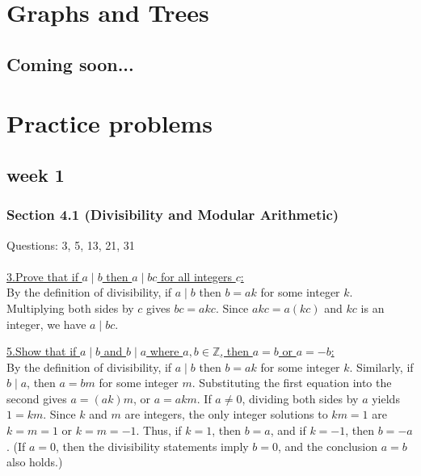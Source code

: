 \documentclass[12pt]{article}
\begin{document}
\section{Graphs and Trees}
\subsection*{Coming soon...}

\newpage
\section{Practice problems}
\subsection*{week 1}


\subsubsection*{Section 4.1 (Divisibility and Modular Arithmetic)}

Questions: 3, 5, 13, 21, 31
\\\\
\underline{3.\;Prove that if $a \mid b$ then $a \mid bc$ for all integers $c$:}
\\\indent By the definition of divisibility, if $a \mid b$ then $b = ak$ for some integer $k$.
Multiplying both sides by $c$ gives $bc = akc$.
Since $akc = a(kc)$ and $kc$ is an integer, we have $a \mid bc$.   

\vspace{5mm}
\underline{5.\;Show that if $a \mid b$ and $b\mid a$ where $a,b \in \mathbb{Z}$, then $a=b$ or $a=-b$:}
\\\indent By the definition of divisibility, if $a \mid b$ then $b = ak$ for some integer $k$.
Similarly, if $b \mid a$, then $a = bm$ for some integer $m$.
Substituting the first equation into the second gives $a = (ak)m$, or $a = akm$.
If $a\neq 0$, dividing both sides by $a$ yields $1 = km$.
Since $k$ and $m$ are integers, the only integer solutions to $km=1$ are $k=m=1$ or $k=m=-1$.
Thus, if $k=1$, then $b=a$, and if $k=-1$, then $b=-a$.
(If $a=0$, then the divisibility statements imply $b=0$, and the conclusion $a=b$ also holds.)
\end{document}
